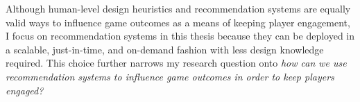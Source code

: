 
Although human-level design heuristics and recommendation systems are equally valid ways to influence game outcomes as a means of keeping player engagement, I focus on recommendation systems in this thesis because they can be deployed in a scalable, just-in-time, and on-demand fashion with less design knowledge required. This choice further narrows my research question onto \textit{how can we use recommendation systems to influence game outcomes in order to keep players engaged?}


